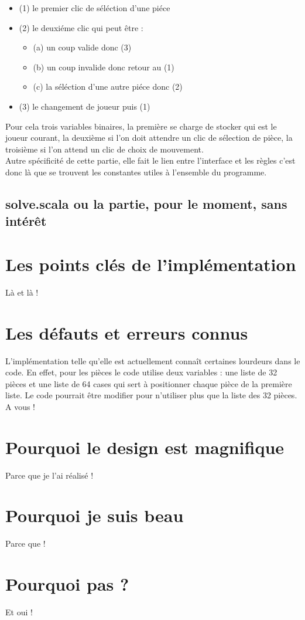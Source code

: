 \documentclass[a4paper]{article}
\begin{document}
\begin{itemize}
	\item (1) le premier clic de séléction d'une piéce
	\item (2) le deuxiéme clic qui peut être :
		\begin{itemize}
		\item	(a) un coup valide donc (3)
		\item	(b) un coup invalide donc retour au (1)
		\item   (c) la séléction d'une autre piéce donc (2)
				
		\end{itemize}
	\item (3) le changement de joueur puis (1)
\end{itemize}
\vspace{0.5 cm}

Pour cela trois variables binaires, la première se charge de stocker qui est le joueur courant, la deuxième si l'on doit attendre un clic de sélection de pièce, la troisième si l'on attend un clic de choix de mouvement. \\

Autre spécificité de cette partie, elle fait le lien entre l'interface et les règles c'est donc là que se trouvent les constantes utiles à l'ensemble du programme.
\subsection{solve.scala ou la partie, pour le moment, sans intérêt}

\section{Les points clés de l'implémentation}

Là et là !

\section{Les défauts et erreurs connus}

L'implémentation telle qu'elle est actuellement connaît certaines lourdeurs dans le code. En effet, pour les pièces le code utilise deux variables : une liste de 32 pièces et une liste de 64 cases qui sert à positionner chaque pièce de la première liste. Le code pourrait être modifier pour n'utiliser plus que la liste des 32 pièces. \\

A vous ! 

\section{Pourquoi le design est magnifique}

Parce que je l'ai réalisé !

\section{Pourquoi je suis beau}

Parce que !

\section{Pourquoi pas ?}

Et oui !
\end{document}
